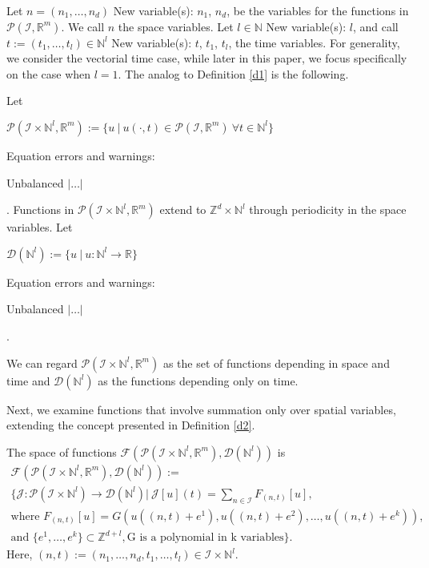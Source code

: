 \documentclass[runningheads]{llncs}
\newcommand{\1}{\chi}
\begin{document}
Let \(n=(n_1,\ldots,n_d)\)
{\color{blue} New variable(s): \(n_1\), \(n_d\),  }
 be the variables for the functions in \(\mathcal{P}(\mathcal{I},\mathbb{R}^m)\). We call \(n\) the space variables. Let \(l\in\mathbb{N}\)
{\color{blue} New variable(s): \(l\),  }
 and call \(t:=(t_1,\ldots,t_l)\in\mathbb{N}^l\)
{\color{blue} New variable(s): \(t\), \(t_1\), \(t_l\),  }
 the time variables. For generality, we consider the vectorial time case, while later in this paper, we focus specifically on the case when \(l=1\).
The analog to Definition \ref{d1} is the following. 
\begin{definition}
	Let {\color{red} \(\mathcal{P}(\mathcal{I}\times\mathbb{N}^l,\mathbb{R}^m):=\{u\ |\ u(\cdot,t)\in\mathcal{P}(\mathcal{I},\mathbb{R}^m)\ \forall t\in\mathbb{N}^l \}\)

  Equation errors and warnings:

 Unbalanced $|\hdots|$}

.
	Functions in \(\mathcal{P}(\mathcal{I}\times\mathbb{N}^l,\mathbb{R}^m)\) extend to \({\mathbb{Z}}^d\times\mathbb{N}^l\) through  periodicity in the space variables.
	Let {\color{red} \(\mathcal{D}(\mathbb{N}^l):=\{u\ |\ u:\mathbb{N}^l\rightarrow\mathbb{R}\}\)

  Equation errors and warnings:

 Unbalanced $|\hdots|$}

.
\end{definition}
We can regard \(\mathcal{P}(\mathcal{I}\times\mathbb{N}^l,\mathbb{R}^m)\) as the set of functions depending in space and time and \(\mathcal{D}(\mathbb{N}^l)\) as the functions depending only on time. 

Next, we examine functions that involve summation only over spatial variables, extending the concept presented in Definition \ref{d2}.
\begin{definition}
	\label{quantityfunc2}
	The space of functions \(\mathcal{F}(\mathcal{P}(\mathcal{I}\times\mathbb{N}^l,\mathbb{R}^m),\mathcal{D}(\mathbb{N}^l))\) is
	\begin{gather*}
		\mathcal{F}(\mathcal{P}(\mathcal{I}\times\mathbb{N}^l,\mathbb{R}^m),\mathcal{D}(\mathbb{N}^l)):=\\	
		\Bigg\{\mathcal{J}:\mathcal{P}(\mathcal{I}\times\mathbb{N}^l)\rightarrow\mathcal{D}(\mathbb{N}^l) \Bigg|\ \mathcal{J}[u](t)=\sum_{n\in\mathcal{I}}F_{(n,t)}[u],\\
		\text{where } F_{(n,t)}[u]=G(u((n,t)+e^1),u((n,t)+e^2),\ldots,u((n,t)+e^k)),\\
		\text{and }
		\{e^1,\ldots,e^k\}\subset{\mathbb{Z}}^{d+l},\text{G is a polynomial in k variables}\Bigg\}.
	\end{gather*}
	Here, \((n,t):=(n_1,\ldots,n_d,t_1,\ldots,t_l)\in\mathcal{I}\times\mathbb{N}^l\).
\end{definition}
\end{document}
